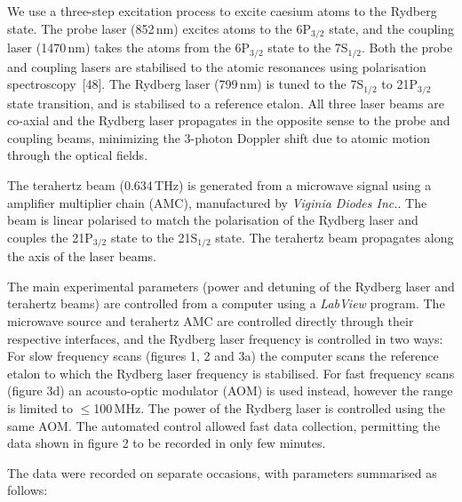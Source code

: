 \documentclass[twocolumn,aps,prl,nobibnotes,8pt]{revtex4-1}
\begin{document}
 We use a three-step excitation process to excite caesium atoms to the Rydberg state. 
The probe laser (852\,nm) excites atoms to the 6P$_{3/2}$ state, and the coupling laser (1470\,nm) takes the atoms from the 6P$_{3/2}$ state to the 7S$_{1/2}$. 
Both the probe and coupling lasers are stabilised to the atomic resonances using polarisation spectroscopy~[48]. 
The Rydberg laser (799\,nm) is tuned to the 7S$_{1/2}$ to 21P$_{3/2}$ state transition, and is stabilised to a reference etalon.
All three laser beams are co-axial and the Rydberg laser propagates in the opposite sense to the probe and coupling beams, minimizing the 3-photon Doppler shift due to atomic motion through the optical fields.
\vspace{0.2cm}

 The terahertz beam (0.634\,THz) is generated from a microwave signal using a amplifier multiplier chain (AMC), manufactured by \emph{Viginia Diodes Inc.}.
The beam is linear polarised to match the polarisation of the Rydberg laser and couples the 21P$_{3/2}$ state to the 21S$_{1/2}$ state.
The terahertz beam propagates along the axis of the laser beams.
\vspace{0.2cm}

 The main experimental parameters (power and detuning of the Rydberg laser and terahertz beams) are controlled from a computer using a \emph{LabView} program. 
The microwave source and terahertz AMC are controlled directly through their respective interfaces, and the Rydberg laser frequency is controlled in two ways:
For slow frequency scans (figures 1, 2 and 3a) the computer scans the reference etalon to which the Rydberg laser frequency is stabilised.
For fast frequency scans (figure 3d) an acousto-optic modulator (AOM) is used instead, however the range is limited to $\leq$100\,MHz.
The power of the Rydberg laser is controlled using the same AOM.
The automated control allowed fast data collection, permitting the data shown in figure 2 to be recorded in only few minutes.


 The data were recorded on separate occasions, with parameters summarised as follows:
\end{document}
